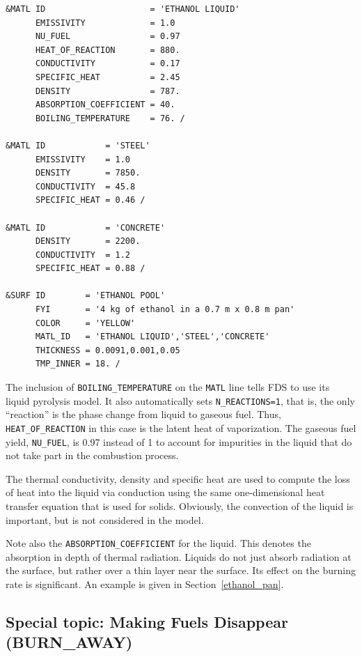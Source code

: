 \documentclass[11pt]{book}
\newcommand{\ct}{\tt\small}
\begin{document}
\footnotesize
\begin{verbatim}
&MATL ID                     = 'ETHANOL LIQUID'
      EMISSIVITY             = 1.0
      NU_FUEL                = 0.97
      HEAT_OF_REACTION       = 880.
      CONDUCTIVITY           = 0.17
      SPECIFIC_HEAT          = 2.45
      DENSITY                = 787.
      ABSORPTION_COEFFICIENT = 40.
      BOILING_TEMPERATURE    = 76. /

&MATL ID            = 'STEEL'
      EMISSIVITY    = 1.0
      DENSITY       = 7850.
      CONDUCTIVITY  = 45.8
      SPECIFIC_HEAT = 0.46 /

&MATL ID            = 'CONCRETE'
      DENSITY       = 2200.
      CONDUCTIVITY  = 1.2
      SPECIFIC_HEAT = 0.88 /

&SURF ID        = 'ETHANOL POOL'
      FYI       = '4 kg of ethanol in a 0.7 m x 0.8 m pan'
      COLOR     = 'YELLOW'
      MATL_ID   = 'ETHANOL LIQUID','STEEL','CONCRETE'
      THICKNESS = 0.0091,0.001,0.05
      TMP_INNER = 18. /
\end{verbatim} \normalsize

\noindent
{}
The inclusion of {\ct BOILING\_TEMPERATURE} on the {\ct MATL} line tells FDS to use its liquid
pyrolysis model. It also automatically sets {\ct N\_REACTIONS=1}, that is, the only ``reaction'' is the
phase change from liquid to gaseous fuel. Thus, {\ct HEAT\_OF\_REACTION} in this case is the latent
heat of vaporization. The gaseous fuel yield, {\ct NU\_FUEL}, is 0.97 instead of 1 to account for
impurities in the liquid that do not take part in the combustion process.

The thermal conductivity, density and specific heat are used
to compute the loss of heat into the liquid via conduction using the
same one-dimensional heat transfer equation that is used for solids. Obviously,
the convection of the liquid is important, but is not considered in
the model.

Note also the {\ct ABSORPTION\_COEFFICIENT} for the liquid. This
denotes the absorption in depth of thermal radiation. Liquids do not
just absorb radiation at the surface, but rather over a thin layer
near the surface. Its effect on the burning rate is significant. An
example is given in Section~\ref{ethanol_pan}.


\subsection{Special topic: Making Fuels Disappear (BURN\_AWAY)}
\end{document}
